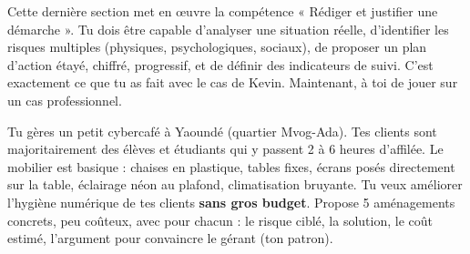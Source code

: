 \documentclass[11pt]{article}
\begin{document}
Cette dernière section met en œuvre la compétence « Rédiger et justifier une démarche ». Tu dois être capable d'analyser une situation réelle, d'identifier les risques multiples (physiques, psychologiques, sociaux), de proposer un plan d'action étayé, chiffré, progressif, et de définir des indicateurs de suivi. C'est exactement ce que tu as fait avec le cas de Kevin. Maintenant, à toi de jouer sur un cas professionnel.

\begin{exercice}
Tu gères un petit cybercafé à Yaoundé (quartier Mvog-Ada). Tes clients sont majoritairement des élèves et étudiants qui y passent 2 à 6 heures d'affilée. Le mobilier est basique : chaises en plastique, tables fixes, écrans posés directement sur la table, éclairage néon au plafond, climatisation bruyante. Tu veux améliorer l'hygiène numérique de tes clients \textbf{sans gros budget}. Propose 5 aménagements concrets, peu coûteux, avec pour chacun : le risque ciblé, la solution, le coût estimé, l'argument pour convaincre le gérant (ton patron).
\end{exercice}
\end{document}
